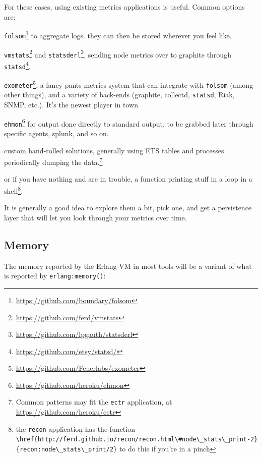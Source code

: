 \documentclass[11pt, oneside]{book}   	%
\newcommand{\app}[1]{\Verb`#1`}
\newcommand{\otpapp}[1]{\Verb`#1`}
\newcommand{\function}[1]{\Verb`#1`}
\newcommand{\expression}[1]{\Verb`#1`}
\begin{document}
For these cases, using existing metrics applications is useful. Common options are:

\begin{itemize*}
	\item \otpapp{folsom}\footnote{\href{https://github.com/boundary/folsom}{https://github.com/boundary/folsom}} to aggregate logs. they can then be stored wherever you feel like.
	\item \otpapp{vmstats}\footnote{\href{https://github.com/ferd/vmstats}{https://github.com/ferd/vmstats}} and \otpapp{statsderl}\footnote{\href{https://github.com/lpgauth/statsderl}{https://github.com/lpgauth/statsderl}}, sending node metrics over to graphite through \app{statsd}\footnote{\href{https://github.com/etsy/statsd/}{https://github.com/etsy/statsd/}}.
	\item \otpapp{exometer}\footnote{\href{https://github.com/Feuerlabs/exometer}{https://github.com/Feuerlabs/exometer}}, a fancy-pants metrics system that can integrate with \otpapp{folsom} (among other things),  and a variety of back-ends (graphite, collectd, \app{statsd}, Riak, SNMP, etc.). It's the newest player in town
	\item \otpapp{ehmon}\footnote{\href{https://github.com/heroku/ehmon}{https://github.com/heroku/ehmon}} for output done directly to standard output, to be grabbed later through specific agents, splunk, and so on.
	\item custom hand-rolled solutions, generally using ETS tables and processes periodically dumping the data.\footnote{Common patterns may fit the \otpapp{ectr} application, at \href{https://github.com/heroku/ectr}{https://github.com/heroku/ectr}}
	\item or if you have nothing and are in trouble, a function printing stuff in a loop in a shell\footnote{the \otpapp{recon} application has the function \function{\href{http://ferd.github.io/recon/recon.html\#node\_stats\_print-2}{recon:node\_stats\_print/2}} to do this if you're in a pinch}.
\end{itemize*}

It is generally a good idea to explore them a bit, pick one, and get a persistence layer that will let you look through your metrics over time.

\subsection{Memory}

The memory reported by the Erlang VM in most tools will be a variant of what is reported by \expression{erlang:memory()}:
\end{document}

